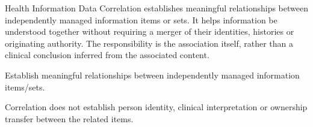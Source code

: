 Health Information Data Correlation establishes meaningful relationships between independently managed information items or sets. It helps information be understood together without requiring a merger of their identities, histories or originating authority. The responsibility is the association itself, rather than a clinical conclusion inferred from the associated content.



Establish meaningful relationships between independently managed information items/\allowbreak{}sets.



Correlation does not establish person identity, clinical interpretation or ownership transfer between the related items.


